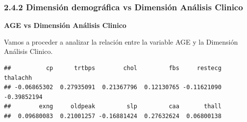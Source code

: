 \documentclass[
]{article}
\newenvironment{Shaded}{\begin{snugshade}}{\end{snugshade}}
\newcommand{\CommentTok}[1]{\textcolor[rgb]{0.56,0.35,0.01}{\textit{#1}}}
\newcommand{\ControlFlowTok}[1]{\textcolor[rgb]{0.13,0.29,0.53}{\textbf{#1}}}
\newcommand{\DecValTok}[1]{\textcolor[rgb]{0.00,0.00,0.81}{#1}}
\newcommand{\FunctionTok}[1]{\textcolor[rgb]{0.13,0.29,0.53}{\textbf{#1}}}
\newcommand{\NormalTok}[1]{#1}
\newcommand{\OtherTok}[1]{\textcolor[rgb]{0.56,0.35,0.01}{#1}}
\newcommand{\SpecialCharTok}[1]{\textcolor[rgb]{0.81,0.36,0.00}{\textbf{#1}}}
\newcommand{\StringTok}[1]{\textcolor[rgb]{0.31,0.60,0.02}{#1}}
\begin{document}
\hypertarget{dimensiuxf3n-demogruxe1fica-vs-dimensiuxf3n-anuxe1lisis-clinico}{%
\subsubsection{2.4.2 Dimensión demográfica vs Dimensión Análisis
Clinico}\label{dimensiuxf3n-demogruxe1fica-vs-dimensiuxf3n-anuxe1lisis-clinico}}

\textbf{AGE vs Dimensión Análisis Clinico}

Vamos a proceder a analizar la relación entre la variable AGE y la
Dimensión Análisis Clinico.

\begin{Shaded}
\end{Shaded}

\begin{verbatim}
##          cp      trtbps        chol         fbs     restecg    thalachh 
## -0.06865302  0.27935091  0.21367796  0.12130765 -0.11621090 -0.39852194 
##        exng     oldpeak         slp         caa       thall 
##  0.09680083  0.21001257 -0.16881424  0.27632624  0.06800138
\end{verbatim}
\end{document}
